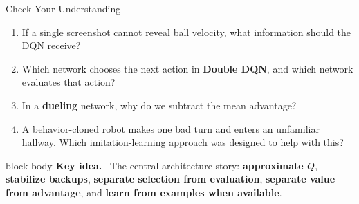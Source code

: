 \documentclass[aspectratio=169,10pt]{beamer}
\renewenvironment{keyidea}{%
  \par\vspace{3pt}\begin{beamercolorbox}[sep=5pt,wd=\linewidth]{block body}%
  {\bfseries\color{CalPolyGreen}Key idea.}\ %
}{\end{beamercolorbox}}
\begin{document}
\begin{frame}{Check Your Understanding}
\small
\begin{enumerate}
\item If a single screenshot cannot reveal ball velocity, what information should the DQN receive?
\item Which network chooses the next action in \textbf{Double DQN}, and which network evaluates that action?
\item In a \textbf{dueling} network, why do we subtract the mean advantage?
\item A behavior-cloned robot makes one bad turn and enters an unfamiliar hallway. Which imitation-learning approach was designed to help with this?
\end{enumerate}
\vspace{9pt}
\begin{keyidea}The central architecture story: \textbf{approximate $Q$}, \textbf{stabilize backups}, \textbf{separate selection from evaluation}, \textbf{separate value from advantage}, and \textbf{learn from examples when available}.\end{keyidea}
\end{frame}
\end{document}
